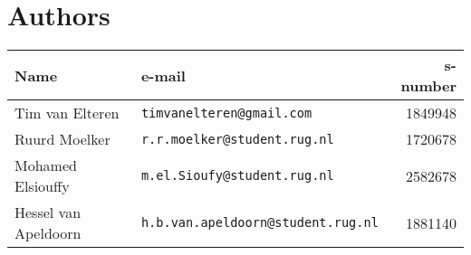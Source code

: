
\chapter*{Authors}
%
\begin{tabularx}{\textwidth}{lXr}%
\toprule
\bf Name 					& \bf e-mail & \bf s-number \\
\toprule
	Tim van Elteren 		& {\tt timvanelteren@gmail.com} 			& 1849948\\
	Ruurd Moelker 	& {\tt r.r.moelker@student.rug.nl} 			& 1720678\\
	Mohamed Elsiouffy 	& {\tt m.el.Sioufy@student.rug.nl} 			& 2582678\\
	Hessel van Apeldoorn & {\tt h.b.van.apeldoorn@student.rug.nl} 					& 1881140\\
\bottomrule
\end{tabularx}

